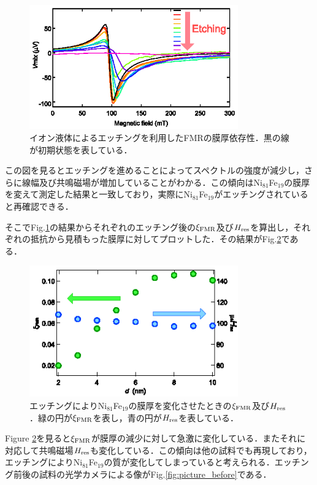 \begin{figure}[htbp]
\centerline{
\includegraphics[width=9cm]{images/meltingFMR_before.eps}
}
\caption{イオン液体によるエッチングを利用したFMRの膜厚依存性．黒の線が初期状態を表している．
}
\label{fig:meltingFMR_before} 
\end{figure}

この図を見るとエッチングを進めることによってスペクトルの強度が減少し，さらに線幅及び共鳴磁場が増加していることがわかる．この傾向はNi$_{81}$Fe$_{19}$の膜厚を変えて測定した結果と一致しており，実際にNi$_{81}$Fe$_{19}$がエッチングされていると再確認できる．

そこでFig.\ref{fig:meltingFMR_before}の結果からそれぞれのエッチング後の$\xi_{\rm FMR}$及び$H_{\rm res}$を算出し，それぞれの抵抗から見積もった膜厚に対してプロットした．その結果がFig.\ref{fig:xi_Hreso_d_before}である．

\begin{figure}[htbp]
\centerline{
\includegraphics[width=9cm]{images/xi_Hreso_d_before.eps}
}
\caption{エッチングによりNi$_{81}$Fe$_{19}$の膜厚を変化させたときの$\xi_{\rm FMR}$及び$H_{\rm res}$．緑の円が$\xi_{\rm FMR}$を表し，青の円が$H_{\rm res}$を表している．
}
\label{fig:xi_Hreso_d_before} 
\end{figure}


Figure \ref{fig:xi_Hreso_d_before}を見ると$\xi_{\rm FMR}$が膜厚の減少に対して急激に変化している．またそれに対応して共鳴磁場$H_{\rm res}$も変化している．この傾向は他の試料でも再現しており，エッチングによりNi$_{81}$Fe$_{19}$の質が変化してしまっていると考えられる．エッチング前後の試料の光学カメラによる像がFig.\ref{fig:picture_before}である．

